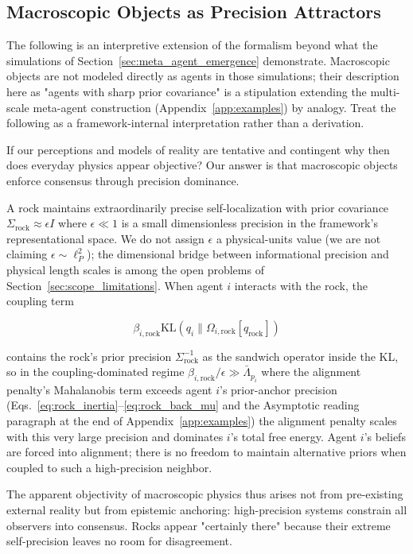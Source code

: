 \documentclass[11pt]{article}
\begin{document}
\subsection{Macroscopic Objects as Precision Attractors}

The following is an interpretive extension of the formalism beyond what the simulations of Section~\ref{sec:meta_agent_emergence} demonstrate. Macroscopic objects are not modeled directly as agents in those simulations; their description here as "agents with sharp prior covariance" is a stipulation extending the multi-scale meta-agent construction (Appendix~\ref{app:examples}) by analogy. Treat the following as a framework-internal interpretation rather than a derivation.

If our perceptions and models of reality are tentative and contingent why then does everyday physics appear objective? Our answer is that macroscopic objects enforce consensus through precision dominance.

A rock maintains extraordinarily precise self-localization with prior covariance $\Sigma_{\mathrm{rock}} \approx \epsilon I$ where $\epsilon \ll 1$ is a small dimensionless precision in the framework's representational space. We do not assign $\epsilon$ a physical-units value (we are not claiming $\epsilon \sim \ell_P^2$); the dimensional bridge between informational precision and physical length scales is among the open problems of Section~\ref{sec:scope_limitations}. When agent $i$ interacts with the rock, the coupling term

\begin{equation}
\beta_{i,\mathrm{rock}}  \mathrm{KL}(q_i \| \Omega_{i,\mathrm{rock}}[q_{\mathrm{rock}}])
\end{equation}

contains the rock's prior precision $\Sigma_{\mathrm{rock}}^{-1}$ as the sandwich operator inside the KL, so in the coupling-dominated regime $\beta_{i,\mathrm{rock}}/\epsilon \gg \bar{\Lambda}_{p_i}$ where the alignment penalty's Mahalanobis term exceeds agent $i$'s prior-anchor precision (Eqs.~\ref{eq:rock_inertia}--\ref{eq:rock_back_mu} and the Asymptotic reading paragraph at the end of Appendix~\ref{app:examples}) the alignment penalty scales with this very large precision and dominates $i$'s total free energy. Agent $i$'s beliefs are forced into alignment; there is no freedom to maintain alternative priors when coupled to such a high-precision neighbor.

The apparent objectivity of macroscopic physics thus arises not from
pre-existing external reality but from epistemic anchoring: high-precision systems constrain all observers into consensus. Rocks appear "certainly there" because their extreme self-precision leaves no room for disagreement.
\end{document}
